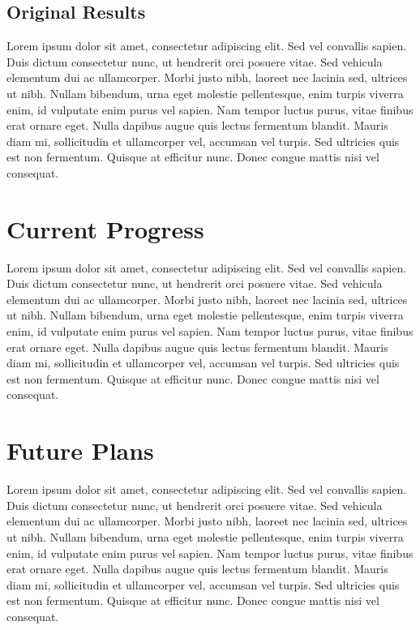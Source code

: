 \documentclass[11pt]{article}
\begin{document}
\begin{multicols}{2}
\subsection{Original Results}
Lorem ipsum dolor sit amet, consectetur adipiscing elit. Sed vel convallis sapien. Duis dictum consectetur nunc, ut hendrerit orci posuere vitae. Sed vehicula elementum dui ac ullamcorper. Morbi justo nibh, laoreet nec lacinia sed, ultrices ut nibh. Nullam bibendum, urna eget molestie pellentesque, enim turpis viverra enim, id vulputate enim purus vel sapien. Nam tempor luctus purus, vitae finibus erat ornare eget. Nulla dapibus augue quis lectus fermentum blandit. Mauris diam mi, sollicitudin et ullamcorper vel, accumsan vel turpis. Sed ultricies quis est non fermentum. Quisque at efficitur nunc. Donec congue mattis nisi vel consequat.

\section{Current Progress}
Lorem ipsum dolor sit amet, consectetur adipiscing elit. Sed vel convallis sapien. Duis dictum consectetur nunc, ut hendrerit orci posuere vitae. Sed vehicula elementum dui ac ullamcorper. Morbi justo nibh, laoreet nec lacinia sed, ultrices ut nibh. Nullam bibendum, urna eget molestie pellentesque, enim turpis viverra enim, id vulputate enim purus vel sapien. Nam tempor luctus purus, vitae finibus erat ornare eget. Nulla dapibus augue quis lectus fermentum blandit. Mauris diam mi, sollicitudin et ullamcorper vel, accumsan vel turpis. Sed ultricies quis est non fermentum. Quisque at efficitur nunc. Donec congue mattis nisi vel consequat.



\section{Future Plans}
Lorem ipsum dolor sit amet, consectetur adipiscing elit. Sed vel convallis sapien. Duis dictum consectetur nunc, ut hendrerit orci posuere vitae. Sed vehicula elementum dui ac ullamcorper. Morbi justo nibh, laoreet nec lacinia sed, ultrices ut nibh. Nullam bibendum, urna eget molestie pellentesque, enim turpis viverra enim, id vulputate enim purus vel sapien. Nam tempor luctus purus, vitae finibus erat ornare eget. Nulla dapibus augue quis lectus fermentum blandit. Mauris diam mi, sollicitudin et ullamcorper vel, accumsan vel turpis. Sed ultricies quis est non fermentum. Quisque at efficitur nunc. Donec congue mattis nisi vel consequat.

\end{multicols}

\scriptsize{
\nocite{*}



}
\end{document}
